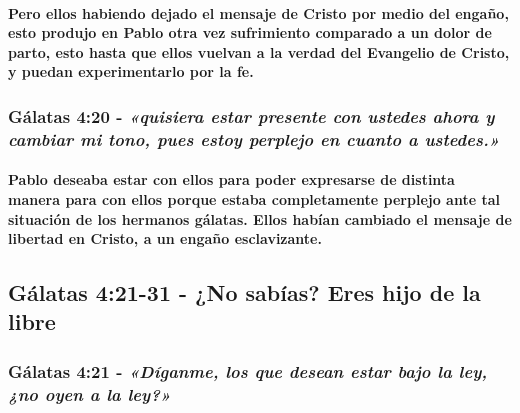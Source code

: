 \documentclass[11a pt,twoside]{article}
\newcommand{\scripture}[1]{%
  {\fontsize{12pt}{16pt}\selectfont\ScriptureFont\itshape #1}%
}
\let\oldsubsection\subsection
\renewcommand{\subsection}{\needspace{5\baselineskip}\oldsubsection}
\let\oldsubsubsection\subsubsection
\renewcommand{\subsubsection}{\needspace{4\baselineskip}\oldsubsubsection}
\let\oldparagraph\paragraph
\renewcommand{\paragraph}{\needspace{3\baselineskip}\oldparagraph}
\begin{document}
\paragraph{Pero ellos habiendo dejado el mensaje de Cristo por medio del
engaño, esto produjo en Pablo otra vez sufrimiento comparado a un dolor
de parto, esto hasta que ellos vuelvan a la verdad del Evangelio de
Cristo, y puedan experimentarlo por la
fe.}\label{pero-ellos-habiendo-dejado-el-mensaje-de-cristo-por-medio-del-engauxf1o-esto-produjo-en-pablo-otra-vez-sufrimiento-comparado-a-un-dolor-de-parto-esto-hasta-que-ellos-vuelvan-a-la-verdad-del-evangelio-de-cristo-y-puedan-experimentarlo-por-la-fe.}

\subsubsection{\texorpdfstring{Gálatas 4:20 -
\scripture{«quisiera estar presente con ustedes ahora y cambiar mi tono, pues estoy perplejo en cuanto a ustedes.»}}{Gálatas 4:20 - }}\label{guxe1latas-420---quisiera-estar-presente-con-ustedes-ahora-y-cambiar-mi-tono-pues-estoy-perplejo-en-cuanto-a-ustedes.}

\paragraph{Pablo deseaba estar con ellos para poder expresarse de
distinta manera para con ellos porque estaba completamente perplejo ante
tal situación de los hermanos gálatas. Ellos habían cambiado el mensaje
de libertad en Cristo, a un engaño
esclavizante.}\label{pablo-deseaba-estar-con-ellos-para-poder-expresarse-de-distinta-manera-para-con-ellos-porque-estaba-completamente-perplejo-ante-tal-situaciuxf3n-de-los-hermanos-guxe1latas.-ellos-habuxedan-cambiado-el-mensaje-de-libertad-en-cristo-a-un-engauxf1o-esclavizante.}

\subsection{Gálatas 4:21-31 - ¿No sabías? Eres hijo de la
libre}\label{guxe1latas-421-31---no-sabuxedas-eres-hijo-de-la-libre}

\subsubsection{\texorpdfstring{Gálatas 4:21 -
\scripture{«Díganme, los que desean estar bajo la ley, ¿no oyen a la ley?»}}{Gálatas 4:21 - }}\label{guxe1latas-421---duxedganme-los-que-desean-estar-bajo-la-ley-no-oyen-a-la-ley}
\end{document}
